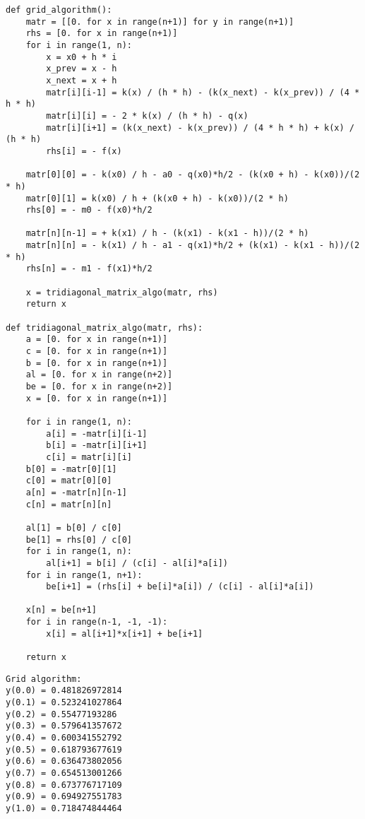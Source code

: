 {\small
\begin{verbatim}
def grid_algorithm():
    matr = [[0. for x in range(n+1)] for y in range(n+1)]
    rhs = [0. for x in range(n+1)]
    for i in range(1, n):
        x = x0 + h * i
        x_prev = x - h
        x_next = x + h
        matr[i][i-1] = k(x) / (h * h) - (k(x_next) - k(x_prev)) / (4 * h * h)
        matr[i][i] = - 2 * k(x) / (h * h) - q(x)
        matr[i][i+1] = (k(x_next) - k(x_prev)) / (4 * h * h) + k(x) / (h * h)
        rhs[i] = - f(x)

    matr[0][0] = - k(x0) / h - a0 - q(x0)*h/2 - (k(x0 + h) - k(x0))/(2 * h)
    matr[0][1] = k(x0) / h + (k(x0 + h) - k(x0))/(2 * h)
    rhs[0] = - m0 - f(x0)*h/2

    matr[n][n-1] = + k(x1) / h - (k(x1) - k(x1 - h))/(2 * h)
    matr[n][n] = - k(x1) / h - a1 - q(x1)*h/2 + (k(x1) - k(x1 - h))/(2 * h)
    rhs[n] = - m1 - f(x1)*h/2

    x = tridiagonal_matrix_algo(matr, rhs)
    return x

def tridiagonal_matrix_algo(matr, rhs):
    a = [0. for x in range(n+1)]
    c = [0. for x in range(n+1)]
    b = [0. for x in range(n+1)]
    al = [0. for x in range(n+2)]
    be = [0. for x in range(n+2)]
    x = [0. for x in range(n+1)]

    for i in range(1, n):
        a[i] = -matr[i][i-1]
        b[i] = -matr[i][i+1]
        c[i] = matr[i][i]
    b[0] = -matr[0][1]
    c[0] = matr[0][0]
    a[n] = -matr[n][n-1]
    c[n] = matr[n][n]

    al[1] = b[0] / c[0]
    be[1] = rhs[0] / c[0]
    for i in range(1, n):
        al[i+1] = b[i] / (c[i] - al[i]*a[i])
    for i in range(1, n+1):
        be[i+1] = (rhs[i] + be[i]*a[i]) / (c[i] - al[i]*a[i])

    x[n] = be[n+1]
    for i in range(n-1, -1, -1):
        x[i] = al[i+1]*x[i+1] + be[i+1]

    return x
\end{verbatim}
}

{\small
\begin{verbatim}
Grid algorithm:
y(0.0) = 0.481826972814
y(0.1) = 0.523241027864
y(0.2) = 0.55477193286
y(0.3) = 0.579641357672
y(0.4) = 0.600341552792
y(0.5) = 0.618793677619
y(0.6) = 0.636473802056
y(0.7) = 0.654513001266
y(0.8) = 0.673776717109
y(0.9) = 0.694927551783
y(1.0) = 0.718474844464
\end{verbatim}
}
